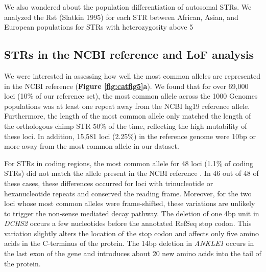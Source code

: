 We also wondered about the population differentiation of autosomal STRs. We analyzed the Rst (Slatkin 1995) for each STR between African, Asian, and European populations for STRs with heterozygosity above 5%


\subsection{STRs in the NCBI reference and LoF analysis}
We were interested in assessing how well the most common alleles are represented in the NCBI reference (\textbf{Figure \ref{fig:catfig5}a}). We found that for over 69,000 loci (10\% of our reference set), the most common allele across the 1000 Genomes populations was at least one repeat away from the NCBI hg19 reference allele. Furthermore, the length of the most common allele only matched the length of the orthologous chimp STR 50\% of the time, reflecting the high mutability of these loci. In addition, 15,581 loci (2.25\%) in the reference genome were 10bp or more away from the most common allele in our dataset.  

For STRs in coding regions, the most common allele for 48 loci (1.1\% of coding STRs) did not match the allele present in the NCBI reference \cite{SuppWillemsGymrekHighnamEtAl2014}. In 46 out of 48 of these cases, these differences occurred for loci with trinucleotide or hexanucleotide repeats and conserved the reading frame. Moreover, for the two loci whose most common alleles were frame-shifted, these variations are unlikely to trigger the non-sense mediated decay pathway. The deletion of one 4bp unit in \emph{DCHS2} occurs a few nucleotides before the annotated RefSeq stop codon. This variation slightly alters the location of the stop codon and affects only five amino acids in the C-terminus of the protein. The 14bp deletion in \emph{ANKLE1} occurs in the last exon of the gene and introduces about 20 new amino acids into the tail of the protein. 

